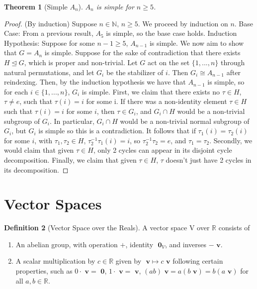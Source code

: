 \documentclass[12pt]{article}
\newtheorem{thm}{Theorem}[section]
\theoremstyle{definition}
\newtheorem{defn}[thm]{Definition}
\theoremstyle{remark}
\numberwithin{equation}{section}
\newcommand\R{\mathbb R}    %
\newcommand\N{\mathbb N}    %
\newcommand\B[1]{\textbf{ #1}}
\newcommand\nsub{\trianglelefteq}
\begin{document}
\begin{thm}[Simple $A_n$]
        $A_n$ is simple for $n \geq 5$.
\end{thm}
\begin{proof}
        (By induction) Suppose $n \in \N$, $n \geq 5$. We proceed by induction on $n$. Base Case: From a previous result, $A_5$ is simple, so the base case holds. Induction Hypothesis: Suppose for some $n-1 \geq 5$, $A_{n-1}$ is simple. We now aim to show that $G = A_n$ is simple.  Suppose for the sake of contradiction that there exists $H \nsub G$, which is proper and non-trivial. Let $G$ act on the set $\{1,...,n\}$ through natural permutations, and let $G_i$ be the stabilizer of $i$. Then $G_i \cong A_{n-1}$ after reindexing. Then, by the induction hypothesis we have that $A_{n-1}$ is simple, so for each $i \in \{1,...,n\}$, $G_i$ is simple. First, we claim that there exists no $\tau \in H$, $\tau \neq e$, such that $\tau(i) = i$ for some i. If there was a non-identity element $\tau \in H$ such that $\tau(i) = i$ for some $i$, then $\tau \in G_i$, and $G_i \cap H$ would be a non-trivial subgroup of $G_i$. In particular, $G_i \cap H$ would be a non-trivial normal subgroup of $G_i$, but $G_i$ is simple so this is a contradiction. It follows that if $\tau_1(i) = \tau_2(i)$ for some $i$, with $\tau_1,\tau_2 \in H$, $\tau_2^{-1}\tau_1(i) = i$, so $\tau_2^{-1}\tau_2 = e$, and $\tau_1 = \tau_2$. Secondly, we would claim that given $\tau \in H$, only 2 cycles can appear in its disjoint cycle decomposition. Finally, we claim that given $\tau \in H$, $\tau$ doesn't just have 2 cycles in its decomposition.
\end{proof}



\clearpage


\section{Vector Spaces}




\begin{defn}[Vector Space over the Reals]
        A vector space V over $\R$ consists of \begin{enumerate}
                \item An abelian group, with operation $+$, identity $\B{0}_V$, and inverses $-\B{v}$.
                \item A scalar multiplication by $c \in \R$ given by $\B{v} \mapsto c\B{v}$ following certain properties, such as $0\cdot \B{v} = \B{0}$, $1\cdot \B{v} = \B{v}$, $(ab)\B{v} = a(b\B{v}) = b(a\B{v})$ for all $a,b\in \R$.
        \end{enumerate}
\end{defn}
\end{document}
